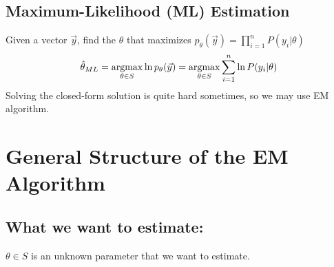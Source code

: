 \documentclass[11pt]{elegantbook}
\newcommand{\argmax}{\operatornamewithlimits{argmax}}
\begin{document}
\subsection*{Maximum-Likelihood (ML) Estimation}
Given a vector $\vec{y}$, find the $\theta$ that maximizes $p_\theta(\vec{y})=\prod_{i=1}^n P(y_i|\theta)$
$$\hat{\theta}_{ML}=\argmax_{\theta\in S}\ln p_\theta(\vec{y})=\argmax_{\theta\in S}\sum_{i=1}^n \ln P(y_i|\theta)$$
Solving the closed-form solution is quite hard sometimes, so we may use EM algorithm.

\section{General Structure of the EM Algorithm}

\subsection*{What we want to estimate:}
$\theta\in S$ is an unknown parameter that we want to estimate.
\end{document}
